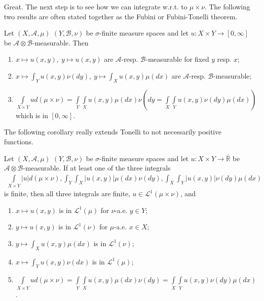 Great. The next step is to see how we can integrate w.r.t. to \(\mu\times\nu\). The following two results are often stated together as the Fubini or Fubini-Tonelli theorem. 

\begin{theorem}    \label{theorem:Tonelli}
    Let \((X,\mathscr{A},\mu)\) \((Y,\mathscr{B},\nu)\) be \(\sigma\)-finite measure spaces and let \(u:X\times Y\rightarrow[0,\infty]\) be \(\mathscr{A}\otimes\mathscr{B}\)-measurable. Then
    \begin{enumerate}[label=(\roman*)]
        \item \(x\mapsto u(x,y), \ y\mapsto u(x,y)\) are \(\mathscr{A}\)-resp. \(\mathscr{B}\)-measurable for fixed \(y\) resp. \(x\);
        \item \(x\mapsto \int_Y u(x,y)\nu(dy), \ y\mapsto\int_X u(x,y) \mu(dx)\) are \(\mathscr{A}\)-resp. \(\mathscr{B}\)-measurable;
        \item \(\int\limits_{X\times Y}ud(\mu\times \nu) = \int\limits_Y\int\limits_X u(x,y)\mu(dx)\nu(dy = \int\limits_X\int\limits_Yu(x,y)\nu(dy)\mu(dx))\) which is in \([0,\infty]\).
    \end{enumerate}
\end{theorem}
The following corollary really extends Tonelli to not necessarily positive functions.
\begin{corollary} \label{corollary:fubini_theorem}
    Let \((X,\mathscr{A},\mu)\) \((Y,\mathscr{B},\nu)\) be \(\sigma\)-finite measure spaces and let \(u:X\times Y\rightarrow\bar{\mathbb{R}}\) be \(\mathscr{A}\otimes\mathscr{B}\)-measurable. If at least one of the three integrals
    \begin{align*}
        \int\limits_{X\times Y}|u|d(\mu\times\nu), \int_Y\int_X |u(x,y)|\mu(dx)\nu(dy), \int_X\int_Y |u(x,y)|\nu(dy)\mu(dx)
    \end{align*}
    is finite, then all three integrals are finite, \(u\in\mathcal{L}^1(\mu\times\nu)\), and
    \begin{enumerate}[label=(\roman*)]
        \item \(x\mapsto u(x,y)\) is in \(\mathcal{L}^1(\mu)\) for \(\nu\)-a.e. \(y\in Y\);
        \item \(y\mapsto u(x,y)\) is in \(\mathcal{L}^1(\nu)\) for \(\mu\)-a.e. \(x\in X\);
        \item \(y\mapsto\int_Xu(x,y)\mu(dx)\) is in \(\mathcal{L}^1(\nu)\);
        \item \(x\mapsto\int_Yu(x,y)\nu(dx)\) is in \(\mathcal{L}^1(\mu)\);
        \item \(\int\limits_{X\times Y}ud(\mu\times\nu)=\int\limits_Y\int\limits_X u(x,y)\mu(dx)\nu(dy)=\int\limits_X\int\limits_Y u(x,y)\nu(dy)\mu(dx)\).
    \end{enumerate}
\end{corollary}